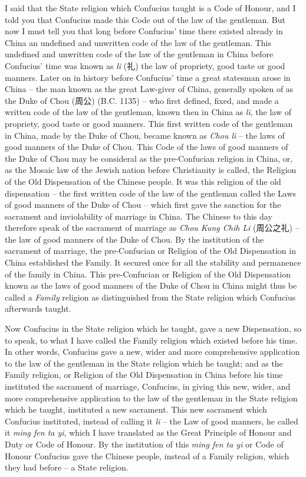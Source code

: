 I said that the State religion which Confucius taught is a Code of Honour, and I told you that Confucius made this Code out of the law of the gentleman. But now I must tell you that long before Confucius' time there existed already in China an undefined and unwritten code of the law of the gentleman. This undefined and unwritten code of the law of the gentleman in China before Confucius' time was known as \emph{li} (礼) the law of propriety, good taste or good manners. Later on in history before Confucius' time a great statesman arose in China -- the man known as the great Law-giver of China, generally spoken of as the Duke of Chou (周公) (B.C. 1135) -- who first defined, fixed, and made a written code of the law of the gentleman, known then in China as \emph{li}, the law of propriety, good taste or good manners. This first written code of the gentleman in China, made by the Duke of Chou, became known as \emph{Chou li} -- the laws of good manners of the Duke of Chou. This Code of the laws of good manners of the Duke of Chou may be consideral as the pre-Confucian religion in China, or, as the Mosaic law of the Jewish nation before Christianity is called, the Religion of the Old Dispensation of the Chinese people. It was this religion of the old dispensation -- the first written code of the law of the gentleman called the Laws of good manners of the Duke of Chou -- which first gave the sanction for the sacrament and inviolability of marriage in China. The Chinese to this day therefore speak of the sacrament of marriage as \emph{Chou Kung Chih Li} (周公之礼) -- the law of good manners of the Duke of Chou. By the institution of the sacrament of marriage, the pre-Confucian or Religion of the Old Dispensation in China established the Family. It secured once for all the stability and permanence of the family in China. This pre-Confucian or Religion of the Old Dispensation known as the laws of good manners of the Duke of Chou in China might thus be called a \emph{Family} religion as distinguished from the State religion which Confucius afterwards taught.

Now Confucius in the State religion which he taught, gave a new Dispensation, so to speak, to what I have called the Family religion which existed before his time. In other words, Confucius gave a new, wider and more comprehensive application to the law of the gentleman in the State religion which he taught; and as the Family religion, or Religion of the Old Dispensation in China before his time instituted the sacrament of marriage, Confucius, in giving this new, wider, and more comprehensive application to the law of the gentleman in the State religion which he taught, instituted a new sacrament. This new sacrament which Confucius instituted, instead of calling it \emph{li} -- the Law of good manners, he called it \emph{ming fen ta yi}, which I have translated as the Great Principle of Honour and Duty or Code of Honour. By the institution of this \emph{ming fen ta yi} or Code of Honour Confucius gave the Chinese people, instead of a Family religion, which they had before -- a State religion.

